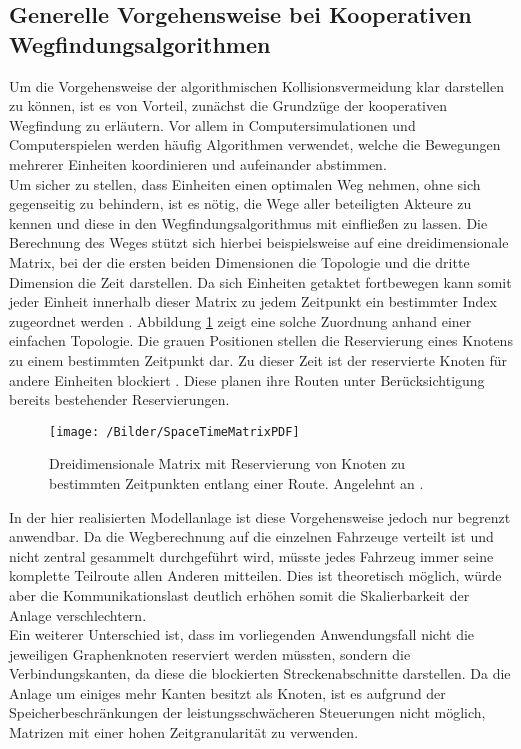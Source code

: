 	\subsection{Generelle Vorgehensweise bei Kooperativen Wegfindungsalgorithmen}
		\label{Coop Pathfinding}
		Um die Vorgehensweise der algorithmischen Kollisionsvermeidung klar darstellen zu können, ist es von Vorteil, zunächst die Grundzüge der kooperativen Wegfindung zu erläutern. Vor allem in Computersimulationen und Computerspielen werden häufig Algorithmen verwendet, welche die Bewegungen mehrerer Einheiten koordinieren und aufeinander abstimmen. 
		\\[4pt]
		Um sicher zu stellen, dass Einheiten einen optimalen Weg nehmen, ohne sich gegenseitig zu behindern, ist es nötig, die Wege aller beteiligten Akteure zu kennen und diese in den Wegfindungsalgorithmus mit einfließen zu lassen. Die Berechnung des Weges stützt sich hierbei beispielsweise auf eine dreidimensionale Matrix, bei der die ersten beiden Dimensionen die Topologie und die dritte Dimension die Zeit darstellen. Da sich Einheiten getaktet fortbewegen kann somit jeder Einheit innerhalb dieser Matrix zu jedem Zeitpunkt ein bestimmter Index zugeordnet werden \cite{Silver2005}. Abbildung \ref{SpaceTimeMatrix} zeigt eine solche Zuordnung anhand einer einfachen Topologie. Die grauen Positionen stellen die Reservierung eines Knotens zu einem bestimmten Zeitpunkt dar. Zu dieser Zeit ist der reservierte Knoten für andere Einheiten blockiert \cite{Erdmann1986}. Diese planen ihre Routen unter Berücksichtigung bereits bestehender Reservierungen.
		
		\begin{figure}[h]
			\centering
			\texttt{[image: /Bilder/SpaceTimeMatrixPDF]}
			\vspace{0.2cm}
			\caption{Dreidimensionale Matrix mit Reservierung von Knoten zu bestimmten Zeitpunkten entlang einer Route. Angelehnt an \cite{Silver2005}.}\label{SpaceTimeMatrix}
		\end{figure}
		
		In der hier realisierten Modellanlage ist diese Vorgehensweise jedoch nur begrenzt anwendbar. Da die Wegberechnung auf die einzelnen Fahrzeuge verteilt ist und nicht zentral gesammelt durchgeführt wird, müsste jedes Fahrzeug immer seine komplette Teilroute allen Anderen mitteilen. Dies ist theoretisch möglich, würde aber die Kommunikationslast deutlich erhöhen somit die Skalierbarkeit der Anlage verschlechtern.
		\\[4pt]
		Ein weiterer Unterschied ist, dass im vorliegenden Anwendungsfall nicht die jeweiligen Graphenknoten reserviert werden müssten, sondern die Verbindungskanten, da diese die blockierten Streckenabschnitte darstellen. Da die Anlage um einiges mehr Kanten besitzt als Knoten, ist es aufgrund der Speicherbeschränkungen der leistungsschwächeren Steuerungen nicht möglich, Matrizen mit einer hohen Zeitgranularität zu verwenden.

